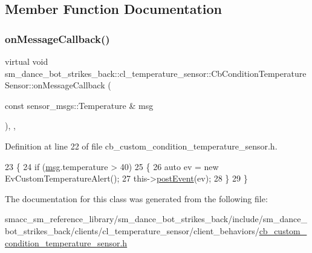 \subsection{Member Function Documentation}
\mbox{\label{classsm__dance__bot__strikes__back_1_1cl__temperature__sensor_1_1CbConditionTemperatureSensor_a98012d6a2c5469fb95990e726d87d98d}} 
\subsubsection{\texorpdfstring{on\+Message\+Callback()}{onMessageCallback()}}
{\footnotesize\ttfamily virtual void sm\+\_\+dance\+\_\+bot\+\_\+strikes\+\_\+back\+::cl\+\_\+temperature\+\_\+sensor\+::\+Cb\+Condition\+Temperature\+Sensor\+::on\+Message\+Callback (\begin{DoxyParamCaption}\item[{const sensor\+\_\+msgs\+::\+Temperature \&}]{msg }\end{DoxyParamCaption})\hspace{0.3cm}{\ttfamily [inline]}, {\ttfamily [override]}, {\ttfamily [virtual]}}



Definition at line 22 of file cb\+\_\+custom\+\_\+condition\+\_\+temperature\+\_\+sensor.\+h.


\begin{DoxyCode}
23   \{
24     \textcolor{keywordflow}{if} (\hyperlink{namespacebattery__monitor__node_ab1920c64448816edd4064e494275fdff}{msg}.temperature > 40)
25     \{
26       \textcolor{keyword}{auto} ev = \textcolor{keyword}{new} EvCustomTemperatureAlert();
27       this->\hyperlink{classsmacc_1_1ISmaccClientBehavior_a5db577c585935114058770f2b7242f8a}{postEvent}(ev);
28     \}
29   \}
\end{DoxyCode}


The documentation for this class was generated from the following file\+:\begin{DoxyCompactItemize}
\item 
smacc\+\_\+sm\+\_\+reference\+\_\+library/sm\+\_\+dance\+\_\+bot\+\_\+strikes\+\_\+back/include/sm\+\_\+dance\+\_\+bot\+\_\+strikes\+\_\+back/clients/cl\+\_\+temperature\+\_\+sensor/client\+\_\+behaviors/\hyperlink{sm__dance__bot__strikes__back_2include_2sm__dance__bot__strikes__back_2clients_2cl__temperature_ecc9ed7c5818f2b7812bf2e5c3b93ea7}{cb\+\_\+custom\+\_\+condition\+\_\+temperature\+\_\+sensor.\+h}\end{DoxyCompactItemize}
